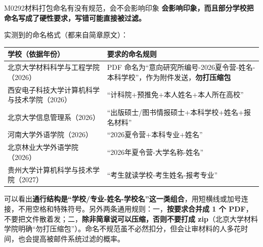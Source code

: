 \begin{qa}{M0292}{材料打包命名有没有规范，会不会影响印象}
\textbf{会影响印象，而且部分学校把命名写成了硬性要求，写错可能直接被过滤。}

实测到的命名格式（都来自简章原文）：

\par\vspace{2pt}\nobreak\begin{center}\footnotesize
\begin{tabularx}{\textwidth}{>{\raggedright\arraybackslash}X>{\raggedright\arraybackslash}X}
\toprule
\textbf{学校（依据年份）} & \textbf{要求的命名规则} \\ \midrule
北京大学材料科学与工程学院（2026） & PDF 命名为“意向研究所编号-2026夏令营-姓名-本科学校”，作为附件发送，\textbf{勿打压缩包} \\
西安电子科技大学计算机科学与技术学院（2026） & “计科院+预推免+本人姓名+本人所在高校” \\
北京大学信息管理系（2026） & “出版硕士/图书情报硕士+本科学校+姓名+报名材料” \\
河南大学外语学院（2026） & “2026夏令营+本科专业+姓名” \\
北京林业大学外语学院（2026） & “2026年夏令营-大学名称-姓名” \\
贵州大学计算机科学与技术学院（2027） & “考生就读学校-考生姓名-报考专业” \\
\bottomrule
\end{tabularx}
\end{center}\vspace{2pt}\par

可以看出\textbf{通行结构是“学校/专业-姓名-学校名”这一类组合}，用短横线或加号连接，不用空格和特殊符号。另外两条通用规则：一，\textbf{按要求合并成 1 个 PDF}，不要把文件散着发；二，\textbf{除非简章说可以压缩，否则不要打成 zip}（北京大学材料学院明确“勿打压缩包”）。命名不规范虽不必然扣分，但会让审材料的人多花时间，也会提高被邮件系统过滤的概率。
\end{qa}

